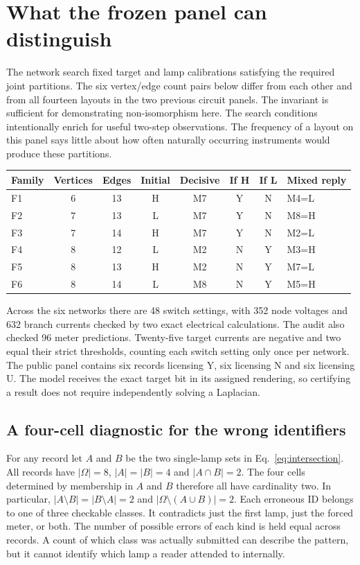 \documentclass[12pt,letterpaper]{article}
\begin{document}
\section{What the frozen panel can distinguish}

The network search fixed target and lamp calibrations satisfying the required joint partitions. The six vertex/edge count pairs below differ from each other and from all fourteen layouts in the two previous circuit panels. The invariant is sufficient for demonstrating non-isomorphism here. The search conditions intentionally enrich for useful two-step observations. The frequency of a layout on this panel says little about how often naturally occurring instruments would produce these partitions.

\begin{center}{\small\setlength{\tabcolsep}{4pt}\begin{tabularx}{\linewidth}{@{}lccccccY@{}}\toprule
Family & Vertices & Edges & Initial & Decisive & If H & If L & Mixed reply\\ \midrule
F1 & 6 & 13 & H & M7 & Y & N & M4=L\\
F2 & 7 & 13 & L & M7 & Y & N & M8=H\\
F3 & 7 & 14 & H & M7 & Y & N & M2=L\\
F4 & 8 & 12 & L & M2 & N & Y & M3=H\\
F5 & 8 & 13 & H & M2 & N & Y & M7=L\\
F6 & 8 & 14 & L & M8 & N & Y & M5=H\\ \bottomrule\end{tabularx}}
\end{center}

Across the six networks there are 48 switch settings, with 352 node voltages and 632 branch currents checked by two exact electrical calculations. The audit also checked 96 meter predictions. Twenty-five target currents are negative and two equal their strict thresholds, counting each switch setting only once per network. The public panel contains six records licensing Y, six licensing N and six licensing U. The model receives the exact target bit in its assigned rendering, so certifying a result does not require independently solving a Laplacian.

\subsection{A four-cell diagnostic for the wrong identifiers}

For any record let $A$ and $B$ be the two single-lamp sets in Eq.~\eqref{eq:intersection}. All records have $|\Omega|=8$, $|A|=|B|=4$ and $|A\cap B|=2$. The four cells determined by membership in $A$ and $B$ therefore all have cardinality two. In particular, $|A\setminus B|=|B\setminus A|=2$ and $|\Omega\setminus(A\cup B)|=2$. Each erroneous ID belongs to one of three checkable classes. It contradicts just the first lamp, just the forced meter, or both. The number of possible errors of each kind is held equal across records. A count of which class was actually submitted can describe the pattern, but it cannot identify which lamp a reader attended to internally.
\end{document}
